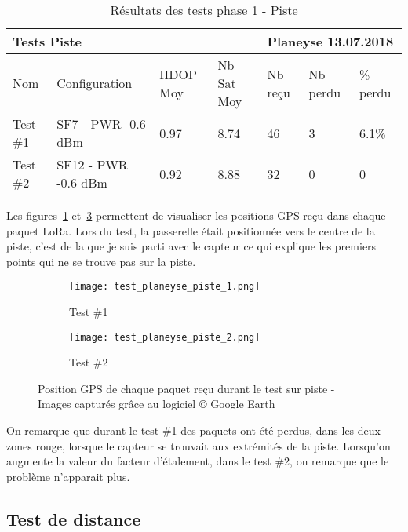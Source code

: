 \begin{table}[htb]
\caption[Résultats des tests phase 1 - Piste]{Résultats des tests phase 1 - Piste}
\label{tab:resultat_test_1_piste}
\centering
\begin{tabular}{lllllll}
\toprule
\multicolumn{4}{l}{ Tests Piste } & \multicolumn{3}{l}{ Planeyse 13.07.2018 } \\
\toprule
Nom & Configuration & HDOP Moy & Nb Sat Moy & Nb reçu & Nb perdu & \% perdu \\
\midrule
Test \#1 & SF7 - PWR -0.6 dBm & 0.97 & 8.74 & 46 & 3 & 6.1\% \\
Test \#2 & SF12 - PWR -0.6 dBm & 0.92 & 8.88 & 32 & 0 & 0  \\
\bottomrule 
\end{tabular}
\end{table}

Les figures~\ref{fig:test_piste_1} et~\ref{fig:test_piste_2} permettent de visualiser les positions GPS reçu dans chaque paquet LoRa. Lors du test, la passerelle était positionnée vers le centre de la piste, c'est de la que je suis parti avec le capteur ce qui explique les premiers points qui ne se trouve pas sur la piste.

\begin{figure}[htb]
\label{tab:resultat_tests_piste}
\centering
\begin{subfigure}[b]{1\textwidth}
   \texttt{[image: test\_planeyse\_piste\_1.png]}
   \caption{Test \#1}
   \label{fig:test_piste_1}
\end{subfigure}

\begin{subfigure}[b]{1\textwidth}
   \texttt{[image: test\_planeyse\_piste\_2.png]}
   \caption{Test \#2}
   \label{fig:test_piste_2}
\end{subfigure}
\caption[Positions GPS des tests piste]{Position GPS de chaque paquet reçu durant le test sur piste - Images capturés grâce au logiciel © Google Earth}
\end{figure}

On remarque que durant le test \#1 des paquets ont été perdus, dans les deux zones rouge, lorsque le capteur se trouvait aux extrémités de la piste. Lorsqu'on augmente la valeur du facteur d'étalement, dans le test \#2, on remarque que le problème n'apparait plus.

\subsection{Test de distance}

